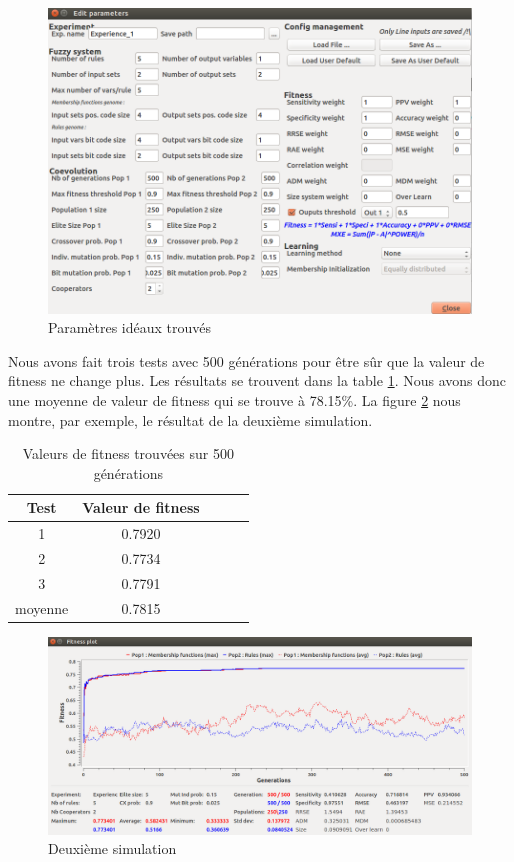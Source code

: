 \begin{figure}[h]
  \centering
    \includegraphics[width=0.8\linewidth]{img/values.png}
  \caption{Paramètres idéaux trouvés}
  \label{parameters}
\end{figure}

Nous avons fait trois tests avec 500 générations pour être sûr que la valeur de fitness ne change plus. Les résultats se trouvent dans la table \ref{resulttab500}. Nous avons donc une moyenne de valeur de fitness qui se trouve à 78.15\%. La figure \ref{secondsim} nous montre, par exemple, le résultat de la deuxième simulation.


\begin{table}[h!]
   \centering
   \begin{tabular}{|c|c|c|c|c|}
      \hline
      Test & Valeur de fitness \\
      \hline
      1 & 0.7920 \\
      2 & 0.7734 \\
      3 & 0.7791 \\
      \hline
      moyenne & 0.7815 \\
      \hline
   \end{tabular}
   \caption{\label{resulttab500} Valeurs de fitness trouvées sur 500 générations}
\end{table}


\begin{figure}[h]
  \centering
    \includegraphics[width=\linewidth]{img/test2.png}
  \caption{Deuxième simulation}
  \label{secondsim}
\end{figure}

